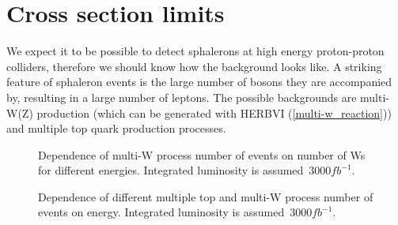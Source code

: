 \documentclass[a4paper,12pt]{article}         %
\begin{document}
\section{Cross section limits}

We expect it to be possible to detect sphalerons at high energy proton-proton colliders, therefore we should know how the background looks like. A striking feature of sphaleron events is the large number of bosons they are accompanied by, resulting in a large number of leptons. The possible backgrounds are multi-W(Z) production (which can be generated with HERBVI (\ref{multi-w_reaction})) and multiple top quark production processes.
\begin{figure}[h!]
\begin{minipage}[h]{0.49\linewidth}
\caption{Dependence of multi-W process number of events on number of Ws for different energies. Integrated luminosity is assumed~$3000 fb^{-1}$.}
\label{ris:multi-w-cross}
\end{minipage}
\hfill
\begin{minipage}[h]{0.49\linewidth}
\caption{Dependence of different multiple top and multi-W process number of events on energy. Integrated luminosity is assumed~$3000 fb^{-1}$.}
\label{ris:top-boson-cross}
\end{minipage}
\end{figure}
\end{document}
